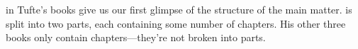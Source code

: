 \documentclass[
  letterpaper,
  DIV=11,
  numbers=noendperiod]{scrartcl}
\begin{document}
 in Tufte's books give us our first
glimpse of the structure of the main matter. \VDQI is split into two
parts, each containing some number of chapters. His other three books
only contain chapters---they're not broken into parts.

\begin{figure}[p]
\hfill
{}
\\\vspace{\baselineskip}

\end{figure}
\end{document}
